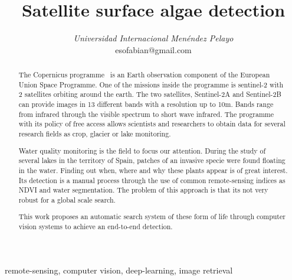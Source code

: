 \documentclass[conference]{IEEEtran}
\begin{document}
    \title{Satellite surface algae detection}

    \author{
    \textit{Universidad Internacional Menéndez Pelayo}\\
    esofabian@gmail.com}

    \maketitle

    \begin{abstract}
        The Copernicus programme~\cite{whatiscopernicus} is an Earth observation component of the European Union Space
        Programme.
        One of the missions inside the programme is sentinel-2\cite{sentinel-2} with 2 satellites orbiting around the
        earth.
        The two satellites, Sentinel-2A and Sentinel-2B can provide images in 13 different bands with a resolution up
        to 10m.
        Bands range from infrared through the visible spectrum to short wave infrared.
        The programme with its policy of free access allows scientists and researchers to obtain data for several
        research fields as crop, glacier or lake monitoring.

        Water quality monitoring is the field to focus our attention.
        During the study of several lakes in the territory of Spain, patches of an invasive specie were found
        floating in the water.
        Finding out when, where and why these plants appear is of great interest.
        Its detection is a manual process through the use of common remote-sensing indices as NDVI\cite{NDVIsource}
        and water segmentation.
        The problem of this approach is that its not very robust for a global scale search.

        This work proposes an automatic search system of these form of life through computer vision systems to
        achieve an end-to-end detection.
    \end{abstract}

    \begin{IEEEkeywords}
        remote-sensing, computer vision, deep-learning, image retrieval
    \end{IEEEkeywords}
\end{document}
